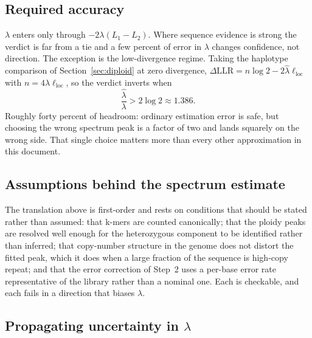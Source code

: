 \documentclass[11pt]{article}
\begin{document}
\subsection{Required accuracy}
\label{sec:required-accuracy}

$\lambda$ enters only through $-2\lambda(L_1-L_2)$.  Where sequence evidence is
strong the verdict is far from a tie and a few percent of error in $\lambda$
changes confidence, not direction.  The exception is the low-divergence regime.
Taking the haplotype comparison of Section~\ref{sec:diploid} at zero divergence,
$\Delta\mathrm{LLR} = n\log 2 - 2\hat\lambda\ell_{\mathrm{loc}}$ with
$n = 4\lambda\ell_{\mathrm{loc}}$, so the verdict inverts when
\begin{equation}
    \frac{\hat\lambda}{\lambda} > 2\log 2 \approx 1.386 .
\end{equation}
Roughly forty percent of headroom: ordinary estimation error is safe, but
choosing the wrong spectrum peak is a factor of two and lands squarely on the
wrong side.  That single choice matters more than every other approximation in
this document.

\subsection{Assumptions behind the spectrum estimate}

The translation above is first-order and rests on conditions that should be
stated rather than assumed: that k-mers are counted canonically; that the
ploidy peaks are resolved well enough for the heterozygous component to be
identified rather than inferred; that copy-number structure in the genome does
not distort the fitted peak, which it does when a large fraction of the
sequence is high-copy repeat; and that the error correction of Step~2 uses a
per-base error rate representative of the library rather than a nominal one.
Each is checkable, and each fails in a direction that biases $\lambda$.

\subsection{\texorpdfstring{Propagating uncertainty in $\lambda$}{Propagating uncertainty in lambda}}
\end{document}
